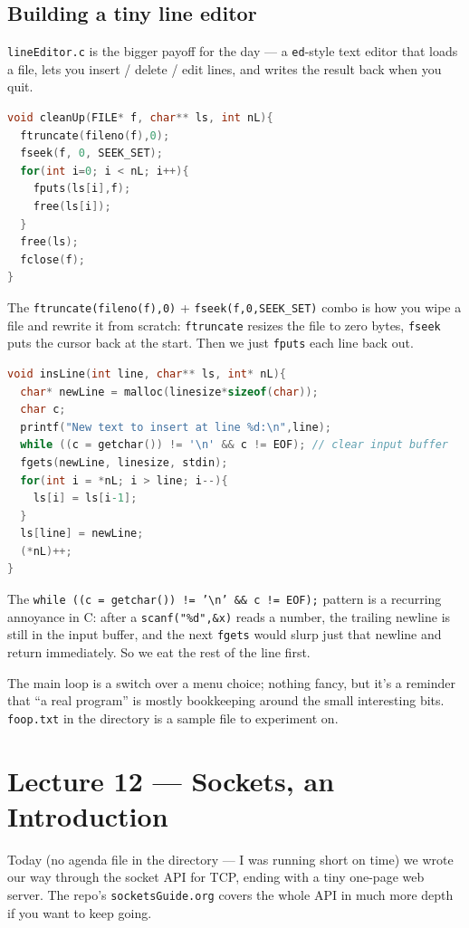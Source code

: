 \documentclass[11pt]{article}
\begin{document}
\subsection*{Building a tiny line editor}

\texttt{lineEditor.c} is the bigger payoff for the day --- a
\texttt{ed}-style text editor that loads a file, lets you insert /
delete / edit lines, and writes the result back when you quit.

\begin{lstlisting}[language=C]
void cleanUp(FILE* f, char** ls, int nL){
  ftruncate(fileno(f),0);
  fseek(f, 0, SEEK_SET);
  for(int i=0; i < nL; i++){
    fputs(ls[i],f);
    free(ls[i]);
  }
  free(ls);
  fclose(f);
}
\end{lstlisting}

The \texttt{ftruncate(fileno(f),0)} + \texttt{fseek(f,0,SEEK\_SET)}
combo is how you wipe a file and rewrite it from scratch:
\texttt{ftruncate} resizes the file to zero bytes, \texttt{fseek}
puts the cursor back at the start. Then we just \texttt{fputs} each
line back out.

\begin{lstlisting}[language=C]
void insLine(int line, char** ls, int* nL){
  char* newLine = malloc(linesize*sizeof(char));
  char c;
  printf("New text to insert at line %d:\n",line);
  while ((c = getchar()) != '\n' && c != EOF); // clear input buffer
  fgets(newLine, linesize, stdin);
  for(int i = *nL; i > line; i--){
    ls[i] = ls[i-1];
  }
  ls[line] = newLine;
  (*nL)++;
}
\end{lstlisting}

The \texttt{while ((c = getchar()) != '\textbackslash n' \&\& c !=
EOF);} pattern is a recurring annoyance in C: after a
\texttt{scanf("\%d",\&x)} reads a number, the trailing newline is
still in the input buffer, and the next \texttt{fgets} would slurp
just that newline and return immediately. So we eat the rest of
the line first.

The main loop is a switch over a menu choice; nothing fancy, but
it's a reminder that ``a real program'' is mostly bookkeeping
around the small interesting bits. \texttt{foop.txt} in the
directory is a sample file to experiment on.

\section{Lecture 12 --- Sockets, an Introduction}

Today (no agenda file in the directory --- I was running short on
time) we wrote our way through the socket API for TCP, ending with
a tiny one-page web server. The repo's \texttt{socketsGuide.org}
covers the whole API in much more depth if you want to keep going.
\end{document}
